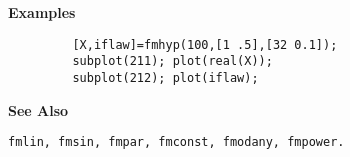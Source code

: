 {\bf \large {}\selectfont Examples}
\begin{verbatim}
         [X,iflaw]=fmhyp(100,[1 .5],[32 0.1]); 
         subplot(211); plot(real(X));
         subplot(212); plot(iflaw);
\end{verbatim}
\vspace*{.5cm}


{\bf \large {}\selectfont See Also}\\
\hspace*{1.5cm}
\begin{minipage}[t]{13.5cm}
\begin{verbatim}
fmlin, fmsin, fmpar, fmconst, fmodany, fmpower.
\end{verbatim}
\end{minipage}


